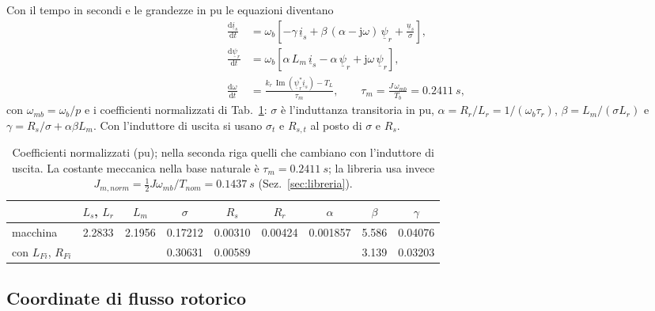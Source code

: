 \documentclass[10pt,a4paper]{scrartcl}
\newcommand{\jj}{\mathrm{j}}
\newcommand{\dif}{\mathrm{d}}
\newcommand{\wb}{\omega_b}
\newcommand{\isv}{\underline{i}_s}
\newcommand{\usv}{\underline{u}_s}
\newcommand{\psv}{\underline{\psi}_r}
\newcommand{\kr}{k_r}
\newcommand{\taur}{\tau_r}
\newcommand{\taum}{\tau_m}
\renewcommand{\Im}{\operatorname{Im}}
\begin{document}
\begin{onehalfspace}
Con il tempo in secondi e le grandezze in pu le equazioni diventano
\begin{align}
\frac{\dif \isv}{\dif t} &= \wb\left[-\gamma\,\isv + \beta\,(\alpha - \jj\omega)\,\psv + \frac{\usv}{\sigma}\right], \label{eq:correntepu}\\
\frac{\dif \psv}{\dif t} &= \wb\left[\alpha\,L_m\,\isv - \alpha\,\psv + \jj\omega\,\psv\right], \label{eq:flussopu}\\
\frac{\dif \omega}{\dif t} &= \frac{\kr\,\Im(\psv^{*}\isv) - T_L}{\taum}, \qquad \taum = \frac{J\,\omega_{mb}}{T_b} = \SI{0.2411}{s}, \label{eq:meccanicapu}
\end{align}
con $\omega_{mb} = \wb/p$ e i coefficienti normalizzati di Tab.~\ref{tab:coeff}: $\sigma$ è l'induttanza transitoria in pu, $\alpha = R_r/L_r = 1/(\wb\taur)$, $\beta = L_m/(\sigma L_r)$ e $\gamma = R_s/\sigma + \alpha\beta L_m$. Con l'induttore di uscita si usano $\sigma_t$ e $R_{s,t}$ al posto di $\sigma$ e $R_s$.

\begin{table}[H]
\centering\small
\begin{tabular}{@{}lcccccccc@{}}
\toprule
 & $L_s$, $L_r$ & $L_m$ & $\sigma$ & $R_s$ & $R_r$ & $\alpha$ & $\beta$ & $\gamma$ \\
\midrule
macchina & \num{2.2833} & \num{2.1956} & \num{0.17212} & \num{0.00310} & \num{0.00424} & \num{0.001857} & \num{5.586} & \num{0.04076} \\
con $L_{Fi}$, $R_{Fi}$ & & & \num{0.30631} & \num{0.00589} & & & \num{3.139} & \num{0.03203} \\
\bottomrule
\end{tabular}
\caption{Coefficienti normalizzati (pu); nella seconda riga quelli che cambiano con l'induttore di uscita. La costante meccanica nella base naturale è $\taum = \SI{0.2411}{s}$; la libreria usa invece $J_{m,norm} = \tfrac12 J\omega_{mb}/T_{nom} = \SI{0.1437}{s}$ (Sez.~\ref{sec:libreria}).}
\label{tab:coeff}
\end{table}

\subsection{Coordinate di flusso rotorico}
\label{sec:coordinate}


\end{onehalfspace}
\end{document}
